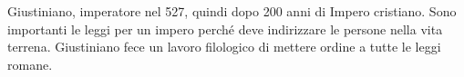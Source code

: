 \documentclass{article}
\title{\jobname}
\author{Eugenio Animali}
\begin{document}
\maketitle

Giustiniano, imperatore nel 527, quindi dopo 200 anni di Impero cristiano. Sono importanti le leggi per un impero perché deve indirizzare le persone nella vita terrena. Giustiniano fece un lavoro filologico di mettere ordine a tutte le leggi romane.
\end{document}
